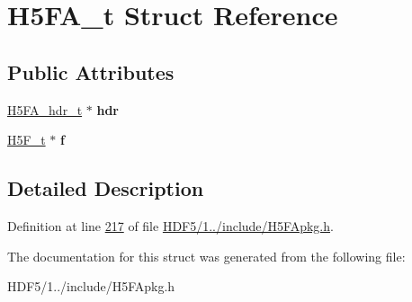 \hypertarget{struct_h5_f_a__t}{}\section{H5\+F\+A\+\_\+t Struct Reference}
\label{struct_h5_f_a__t}
\subsection*{Public Attributes}
\begin{DoxyCompactItemize}
\item 
\mbox{\label{struct_h5_f_a__t_a2a10cebd73ab0d9df877354fd997e999}} 
\hyperlink{struct_h5_f_a__hdr__t}{H5\+F\+A\+\_\+hdr\+\_\+t} $\ast$ {\bfseries hdr}
\item 
\mbox{\label{struct_h5_f_a__t_a93e852eb39f72551f30ed228969a4121}} 
\hyperlink{struct_h5_f__t}{H5\+F\+\_\+t} $\ast$ {\bfseries f}
\end{DoxyCompactItemize}


\subsection{Detailed Description}


Definition at line \hyperlink{_h_d_f5_21_810_81_2include_2_h5_f_apkg_8h_source_l00217}{217} of file \hyperlink{_h_d_f5_21_810_81_2include_2_h5_f_apkg_8h_source}{H\+D\+F5/1../include/\+H5\+F\+Apkg.\+h}.



The documentation for this struct was generated from the following file\+:\begin{DoxyCompactItemize}
\item 
H\+D\+F5/1../include/\+H5\+F\+Apkg.\+h\end{DoxyCompactItemize}

